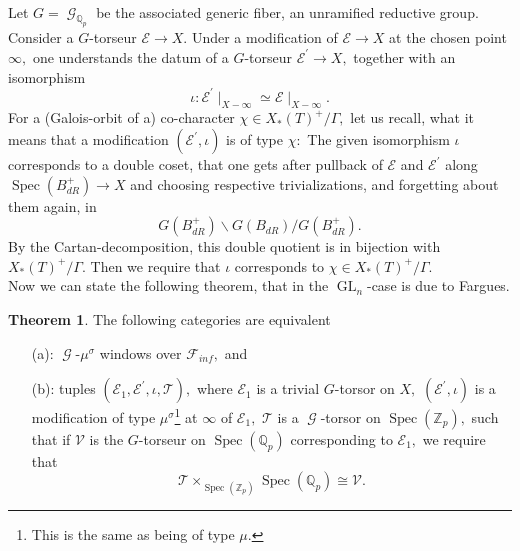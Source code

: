 \documentclass[a4paper,10,5 pt]{amsart}
\theoremstyle{definition}
\newtheorem{Theorem}[Satz]{Theorem}
\DeclareMathOperator{\Spec}{Spec}
\DeclareMathOperator{\GL}{GL}
\DeclareMathOperator{\G}{\mathcal{G}}
\begin{document}
\\ 
Let $G=\G_{\mathbb{Q}_{p}}$ be the associated generic fiber, an unramified reductive group. Consider a $G$-torseur $\mathcal{E}\rightarrow X.$ Under a modification of $\mathcal{E}\rightarrow X$ at the chosen point $\infty,$ one understands the datum of a $G$-torseur $\mathcal{E}^{\prime}\rightarrow X,$ together with an isomorphism
$$
\iota\colon \mathcal{E}^{\prime}\mid_{X-\infty}\simeq \mathcal{E}\mid_{X-\infty}.
$$
For a (Galois-orbit of a) co-character $\chi\in X_{*}(T)^{+}/\Gamma,$ let us recall, what it means that a modification $(\mathcal{E}^{\prime},\iota)$ is of type $\chi:$ The given isomorphism $\iota$ corresponds to a double coset, that one gets after pullback of $\mathcal{E}$ and $\mathcal{E}^{\prime}$ along $\Spec(B_{dR}^{+})\rightarrow X$ and choosing respective trivializations, and forgetting about them again, in
$$
G(B_{dR}^{+})\backslash G(B_{dR})/G(B_{dR}^{+}).
$$
By the Cartan-decomposition, this double quotient is in bijection with $X_{*}(T)^{+}/\Gamma.$ Then we require that $\iota$ corresponds to $\chi\in X_{*}(T)^{+}/\Gamma.$
\\
Now we can state the following theorem, that in the $\GL_{n}$-case is due to Fargues.
\begin{Theorem}
The following categories are equivalent
\begin{enumerate}
\item[(a):] $\G$-$\mu^{\sigma}$ windows over $\mathcal{F}_{inf},$ and
\item[(b):] tuples $(\mathcal{E}_{1},\mathcal{E}^{\prime},\iota,\mathcal{T}),$ where $\mathcal{E}_{1}$ is a trivial $G$-torsor on $X,$ $(\mathcal{E}^{\prime},\iota)$ is a modification of type $\mu^{\sigma}$\footnote{This is the same as being of type $\mu$.} at $\infty$ of $\mathcal{E}_{1},$ $\mathcal{T}$ is a $\G$-torsor on $\Spec(\mathbb{Z}_{p}),$ such that if $\mathcal{V}$ is the $G$-torseur on $\Spec(\mathbb{Q}_{p})$ corresponding to $\mathcal{E}_{1},$ we require that
$$
\mathcal{T}\times_{\Spec(\mathbb{Z}_{p})}\Spec(\mathbb{Q}_{p})\cong \mathcal{V}.
$$
\end{enumerate}
\end{Theorem}
\end{document}
